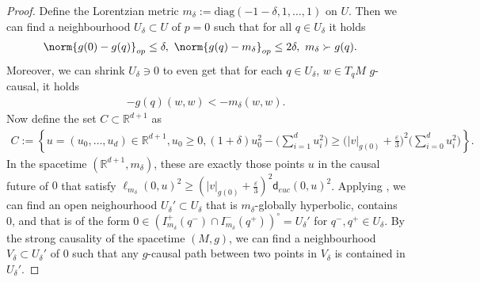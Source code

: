\documentclass[a4paper,10pt]{article}
\numberwithin{equation}{section}
\newcommand{\R}{\mathbb{R}}
\newcommand{\e}{\varepsilon}
\newcommand{\sfd}{\mathsf d}
\begin{document}
\begin{proof}
    Define the Lorentzian metric $m_{\delta} := \mathrm{diag}(-1-\delta, 1, \ldots, 1)$ on $U$. Then we can find a neighbourhood $U_\delta \subset U$ of $p=0$ such that for all $q \in U_\delta$ it holds
    \begin{align*}
        &\norm{g(0)-g(q)}_{op} \leq \delta ,\ \norm{g(q)-m_{\delta}}_{op} \leq 2\delta , \ m_\delta \succ g(q).
    \end{align*}
    Moreover, we can shrink $U_\delta \ni 0$ to even get that for each $q \in U_\delta$, $w \in T_qM$ $g$-causal, it holds
    \begin{align}\label{m_delta_stronger_than_g}
        -g(q)(w,w) < - m_{\delta}(w,w).
    \end{align}
    Now define the set $C \subset \R^{d+1}$ as
    \begin{align*}
        C:= \left\{ u=(u_0, \ldots, u_d) \in \R^{d+1}, u_0 \geq 0, (1+\delta)u_0^2 -\Big(\sum_{i=1}^d u_i^2\Big) \geq \Big(|v|_{g(0)} + \frac{\e}{3}\Big)^2\Big(\sum_{i=0}^d u_i^2\Big)  \right\}. 
    \end{align*}
    In the spacetime $(\R^{d+1}, m_\delta)$, these are exactly those points $u$ in the causal future of $0$ that satisfy $\ell_{m_\delta}(0, u)^2 \geq (|v|_{g(0)}+\frac{\e}{3})^2\sfd_{euc}(0, u)^2$.
    Applying \cite[Theorem 2.14]{minguzzi2008causal}, we can find an open neighourhood $U_\delta' \subset U_\delta$ that is $m_\delta$-globally hyperbolic, contains $0$, and that is of the form $0 \in (I^+_{m_\delta}(q^-)\cap I^-_{m_\delta}(q^+) )^\circ = U_\delta'$ for $q^-, q^+ \in U_\delta$. By the strong causality of the spacetime $(M, g)$, we can find a neighbourhood $V_\delta \subset U_\delta'$ of $0$ such that any $g$-causal path between two points in $V_\delta$ is contained in $U_\delta'$.
    

\end{proof}
\end{document}
